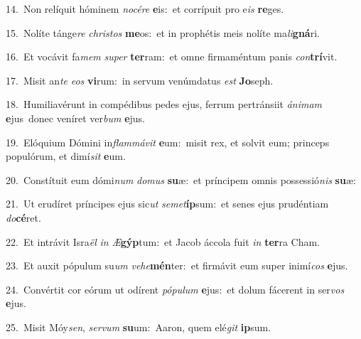 {\numbfont\textcolor{\numbcolor}{14.}}~Non relíquit hóminem \textit{no}\-\textit{cé}\textit{re} \textbf{e}\-is:~\star et corrípuit pro e\textit{is} \textbf{re}\-ges.\par
{\numbfont\textcolor{\numbcolor}{15.}}~Nolíte tánge\textit{re} \textit{chris}\-\textit{tos} \textbf{me}\-os:~\star et in prophétis meis nolíte ma\-\textit{li}\-\textbf{gná}ri.\par
{\numbfont\textcolor{\numbcolor}{16.}}~Et vocávit fa\textit{mem} \textit{su}\-\textit{per} \textbf{ter}\-ram:~\star et omne firmaméntum panis \textit{con}\-\textbf{trí}vit.\par
{\numbfont\textcolor{\numbcolor}{17.}}~Misit an\textit{te} \textit{e}\-\textit{os} \textbf{vi}\-rum:~\star in servum venúmdatus \textit{est} \textbf{Jo}\-seph.\par
{\numbfont\textcolor{\numbcolor}{18.}}~Humiliavérunt in compédibus pedes ejus, ferrum pertránsiit \textit{á}\-\textit{ni}\textit{mam} \textbf{e}\-jus~\star donec veníret ver\textit{bum} \textbf{e}\-jus.\par
{\numbfont\textcolor{\numbcolor}{19.}}~Elóquium Dómini in\-\textit{flam}\-\textit{má}\textit{vit} \textbf{e}\-um:~\star misit rex, et solvit eum; princeps populórum, et dimí\textit{sit} \textbf{e}\-um.\par
{\numbfont\textcolor{\numbcolor}{20.}}~Constítuit eum dómi\textit{num} \textit{do}\-\textit{mus} \textbf{su}\-æ:~\star et príncipem omnis possessió\textit{nis} \textbf{su}\-æ:\par
{\numbfont\textcolor{\numbcolor}{21.}}~Ut erudíret príncipes ejus sic\textit{ut} \textit{se}\-\textit{met}\textbf{íp}sum:~\star et senes ejus prudéntiam \textit{do}\-\textbf{cé}ret.\par
{\numbfont\textcolor{\numbcolor}{22.}}~Et intrávit Isra\textit{ël} \textit{in} \textit{Æ}\-\textbf{gýp}tum:~\star et Jacob áccola fuit \textit{in} \textbf{ter}\-ra Cham.\par
{\numbfont\textcolor{\numbcolor}{23.}}~Et auxit pópulum su\textit{um} \textit{ve}\-\textit{he}\textbf{mén}ter:~\star et firmávit eum super inimí\textit{cos} \textbf{e}\-jus.\par
{\numbfont\textcolor{\numbcolor}{24.}}~Convértit cor eórum ut odírent \textit{pó}\-\textit{pu}\textit{lum} \textbf{e}\-jus:~\star et dolum fácerent in ser\textit{vos} \textbf{e}\-jus.\par
{\numbfont\textcolor{\numbcolor}{25.}}~Misit Móy\-\textit{sen}\-, \textit{ser}\-\textit{vum} \textbf{su}\-um:~\star Aaron, quem elé\textit{git} \textbf{ip}\-sum.\par
